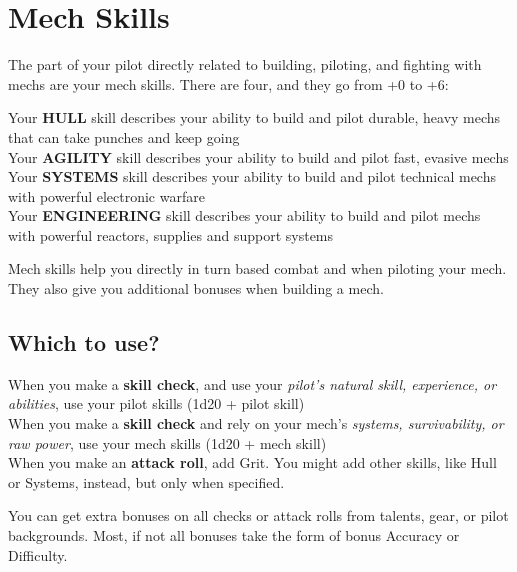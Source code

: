 \section{Mech Skills}

The part of your pilot directly related to building, piloting, and fighting with mechs are your mech
skills. There are four, and they go from +0 to +6:

Your \textbf{HULL} skill describes your ability to build and pilot durable, heavy mechs that can take
punches and keep going \\
Your \textbf{AGILITY} skill describes your ability to build and pilot fast,
evasive mechs \\
Your \textbf{SYSTEMS} skill describes your ability to build and pilot technical mechs with powerful
electronic warfare \\
Your \textbf{ENGINEERING} skill describes your ability to build and pilot mechs with powerful reactors,
supplies and support systems

Mech skills help you directly in turn based combat and when piloting your mech. They also give
you additional bonuses when building a mech.

\subsection*{Which to use?}

When you make a \textbf{skill check}, and use your \textit{pilot's natural skill, experience, or abilities}, use your
pilot skills (1d20 + pilot skill) \\
When you make a \textbf{skill check} and rely on your mech's \textit{systems, survivability, or raw power}, use
your mech skills (1d20 + mech skill) \\
When you make an \textbf{attack roll}, add Grit. You might add other skills, like Hull or Systems, instead,
but only when specified.

You can get extra bonuses on all checks or attack rolls from talents, gear, or pilot backgrounds.
Most, if not all bonuses take the form of bonus Accuracy or Difficulty.